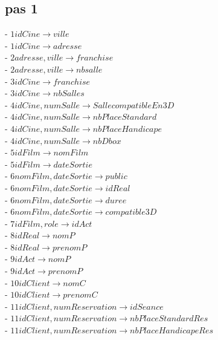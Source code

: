 \documentclass[a4paper,sffamily,12pt]{article}
\begin{document}
					\subsection{pas 1}
		
						\noindent- $ 1 idCine \rightarrow ville$ \\
						- $ 1 idCine \rightarrow adresse$ \\
						- $2 adresse, ville \rightarrow franchise$ \\
						- $2 adresse, ville \rightarrow nbsalle$ \\
						- $ 3 idCine \rightarrow franchise$ \\
						- $ 3 idCine \rightarrow nbSalles$ \\
						- $ 4 idCine, numSalle \rightarrow SallecompatibleEn3D$ \\
				 		- $ 4 idCine, numSalle \rightarrow nbPlaceStandard$ \\
				 		- $ 4 idCine, numSalle \rightarrow nbPlaceHandicape$ \\
				 		- $ 4 idCine, numSalle \rightarrow nbDbox$ \\
				 		- $ 5 idFilm \rightarrow nomFilm$ \\
				 		- $ 5 idFilm \rightarrow dateSortie$ \\				 		
						- $ 6 nomFilm, dateSortie \rightarrow public$ \\
						- $ 6 nomFilm, dateSortie \rightarrow idReal$ \\
						- $ 6 nomFilm, dateSortie \rightarrow duree$ \\
						- $ 6 nomFilm, dateSortie \rightarrow compatible3D$ \\
						- $ 7idFilm, role \rightarrow  idAct$ \\
						- $ 8 idReal \rightarrow nomP$ \\
						- $ 8 idReal \rightarrow prenomP$ \\						
						- $ 9 idAct \rightarrow nomP$ \\
						- $ 9 idAct \rightarrow prenomP $ \\						
						- $ 10 idClient \rightarrow nomC$ \\
						- $ 10 idClient \rightarrow prenomC$ \\						
						- $11 idClient, numReservation \rightarrow idSeance$ \\
						- $11 idClient, numReservation \rightarrow nbPlaceStandardRes$ \\
						- $11 idClient, numReservation \rightarrow nbPlaceHandicapeRes$ \\
\end{document}
